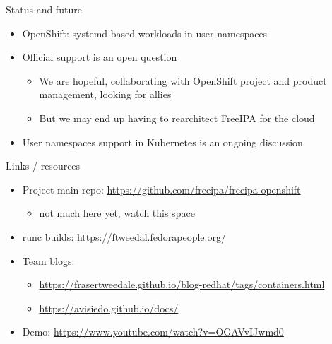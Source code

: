 \documentclass[ignorenonframetext,aspectratio=169,12pt]{beamer}
\begin{document}
\begin{frame}{Status and future}
\protect\hypertarget{future}{}

\begin{itemize}
\item OpenShift: systemd-based workloads in user namespaces
\item Official support is an open question
    \begin{itemize}
    \item We are hopeful, collaborating with OpenShift project and
      product management, looking for allies
    \item But we may end up having to rearchitect FreeIPA for the cloud
    \end{itemize}
\item User namespaces support in Kubernetes is an ongoing discussion
\end{itemize}

\end{frame}

\begin{frame}{Links / resources}
\protect\hypertarget{links}{}

\begin{itemize}
\item Project main repo: \url{https://github.com/freeipa/freeipa-openshift}
    \begin{itemize}
    \item not much here yet, watch this space
    \end{itemize}
\item runc builds: \url{https://ftweedal.fedorapeople.org/}
\item Team blogs:
    \begin{itemize}
    \item \url{https://frasertweedale.github.io/blog-redhat/tags/containers.html}
    \item \url{https://avisiedo.github.io/docs/}
    \end{itemize}
\item Demo: \url{https://www.youtube.com/watch?v=OGAVvIJwmd0}
\end{itemize}

\end{frame}
\end{document}

